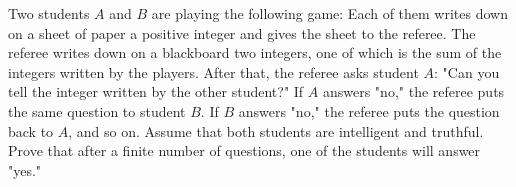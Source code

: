 Two students $A$ and $B$ are playing the following game: Each of them writes down on a sheet of paper a positive integer and gives the sheet to the referee. The referee writes down on a blackboard two integers, one of which is the sum of the integers written by the players. After that, the referee asks student $A$: "Can you tell the integer written by the other student?" If $A$ answers "no," the referee puts the same question to student $B$. If $B$ answers "no," the referee puts the question back to $A$, and so on. Assume that both students are intelligent and truthful. Prove that after a finite number of questions, one of the students will answer "yes."
